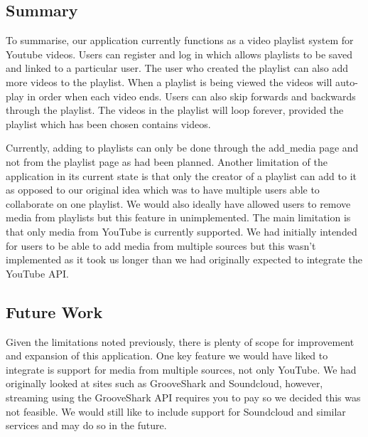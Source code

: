 \documentclass{sig-alt-release2}
\begin{document}
\subsection{Summary}

To summarise, our application currently functions as a video playlist system for Youtube videos. Users can register and log in which allows playlists to be saved and linked to a particular user. The user who created the playlist can also add more videos to the playlist. When a playlist is being viewed the videos will auto-play in order when each video ends. Users can also skip forwards and backwards through the playlist. The videos in the playlist will loop forever, provided the playlist which has been chosen contains videos.

Currently, adding to playlists can only be done through the add\verb=_=media page and not from the playlist page as had been planned. Another limitation of the application in its current state is that only the creator of a playlist can add to it as opposed to our original idea which was to have multiple users able to collaborate on one playlist. We would also ideally have allowed users to remove media from playlists but this feature in unimplemented. The main limitation is that only media from YouTube is currently supported. We had initially intended for users to be able to add media from multiple sources but this wasn't implemented as it took us longer than we had originally expected to integrate the YouTube API.

\subsection{Future Work}
Given the limitations noted previously, there is plenty of scope for improvement and expansion of this application. One key feature we would have liked to integrate is support for media from multiple sources, not only YouTube. We had originally looked at sites such as GrooveShark and Soundcloud, however, streaming using the GrooveShark API requires you to pay so we decided this was not feasible. We would still like to include support for Soundcloud and similar services and may do so in the future.
\end{document}

